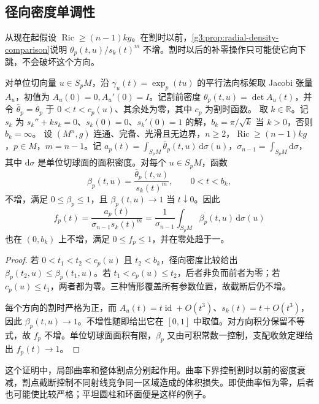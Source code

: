 \subsection{径向密度单调性}
\label{g3:subsec:0802:02}

从现在起假设 \(\operatorname{Ric}\ge(n-1)kg\)。在割时以前，\cref{g3:prop:radial-density-comparison}说明 \(\theta_p(t,u)/s_k(t)^m\) 不增。割时以后的补零操作只可能使它向下跳，不会破坏这个方向。

\begin{proposition}\label{g3:prop:cut-density-monotonicity}
	对单位切向量 \(u\in S_pM\)，沿 \(\gamma_u(t)=\exp_p(tu)\) 的平行法向标架取 Jacobi 张量 \(A_u\)，初值为 \(A_u(0)=0,A_u'(0)=I\)。记割前密度 \(\theta_p(t,u)=\det A_u(t)\)，并令 \(\overline\theta_p=\theta_p\) 于 \(0<t<c_p(u)\)、其余处为零，其中 \(c_p\) 为割时函数。
	取 \(k\in\mathbb R\)。记 \(s_k\) 为 \(s_k''+ks_k=0\)、\(s_k(0)=0\)、\(s_k'(0)=1\) 的解，\(b_k=\pi/\sqrt k\) 当 \(k>0\)，否则 \(b_k=\infty\)。
	设 \((M^n,g)\) 连通、完备、光滑且无边界，\(n\ge2\)，\(\operatorname{Ric}\ge(n-1)kg\)，\(p\in M\)，\(m=n-1\)。记 \(a_p(t)=\int_{S_pM}\overline\theta_p(t,u)\,\mathrm d\sigma(u)\)，\(\sigma_{n-1}=\int_{S_pM}\mathrm d\sigma\)，其中 \(\mathrm d\sigma\) 是单位切球面的面积密度。对每个 \(u\in S_pM\)，函数
	\[
		\beta_p(t,u)=\frac{\overline\theta_p(t,u)}{s_k(t)^m},\qquad0<t<b_k,
	\]
	不增，满足 \(0\le\beta_p\le1\)，且 \(\beta_p(t,u)\to1\) 当 \(t\downarrow0\)。因此
	\begin{equation}\label{g3:eq:spherical-density-ratio}
		f_p(t)=\frac{a_p(t)}{\sigma_{n-1}s_k(t)^m}
		=\frac1{\sigma_{n-1}}\int_{S_pM}\beta_p(t,u)\,\mathrm d\sigma(u)
	\end{equation}
	也在 \((0,b_k)\) 上不增，满足 \(0\le f_p\le1\)，并在零处趋于一。
\end{proposition}
\begin{proof}
	若 \(0<t_1<t_2<c_p(u)\) 且 \(t_2<b_k\)，径向密度比较给出 \(\beta_p(t_2,u)\le\beta_p(t_1,u)\)。若 \(t_1<c_p(u)\le t_2\)，后者非负而前者为零；若 \(c_p(u)\le t_1\)，两者都为零。三种情形覆盖所有参数位置，故截断后仍不增。

	每个方向的割时严格为正，而 \(A_u(t)=t\operatorname{id}+O(t^3)\)、\(s_k(t)=t+O(t^3)\)，因此 \(\beta_p(t,u)\to1\)。不增性随即给出它在 \([0,1]\) 中取值。对方向积分保留不等式，故 \(f_p\) 不增。单位切球面面积有限，\(\beta_p\) 又由可积常数一控制，支配收敛定理给出 \(f_p(t)\to1\)。
\end{proof}

这个证明中，局部曲率和整体割点分别起作用。曲率下界控制割时以前的密度衰减，割点截断控制不同射线竞争同一区域造成的体积损失。即使曲率恒为零，后者也可能使比较严格；平坦圆柱和环面便是这样的例子。

